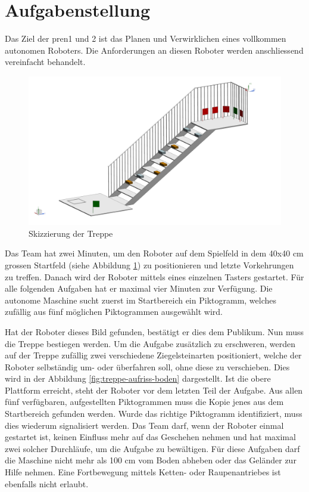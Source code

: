 \newpage
\section{Aufgabenstellung}

Das Ziel der \acrfull{pren1} und 2 ist das Planen und Verwirklichen eines vollkommen autonomen Roboters. Die Anforderungen an diesen Roboter werden anschliessend vereinfacht behandelt. 
 
\begin{figure}[H]
  \includegraphics[width=1\textwidth]{img/Aufgabenstellung.png}
  \centering
  \caption{Skizzierung der Treppe}
  \label{fig:seitenansicht-treppe}
\end{figure}
 
Das Team hat zwei Minuten, um den Roboter auf dem Spielfeld in dem 40x40 cm grossen 
Startfeld (siehe Abbildung \ref{fig:seitenansicht-treppe}) zu positionieren und letzte Vorkehrungen zu treffen. Danach wird der Roboter mittels eines einzelnen Tasters gestartet. 
Für alle folgenden Aufgaben hat er maximal vier Minuten zur Verfügung. 
Die autonome Maschine sucht zuerst im Startbereich ein Piktogramm, welches zufällig aus fünf möglichen Piktogrammen ausgewählt wird.

\newpage

Hat der Roboter dieses Bild gefunden, bestätigt er dies dem Publikum. Nun muss die Treppe bestiegen werden. Um die Aufgabe zusätzlich zu erschweren, werden auf der Treppe zufällig zwei verschiedene Ziegelsteinarten positioniert, welche der Roboter selbständig um- oder überfahren soll, ohne diese zu verschieben. Dies wird in der Abbildung \ref{fig:treppe-aufriss-boden} dargestellt. Ist die obere Plattform erreicht, steht der Roboter vor dem letzten Teil der Aufgabe. Aus allen fünf verfügbaren, aufgestellten Piktogrammen muss die Kopie jenes aus dem Startbereich gefunden werden. Wurde das richtige Piktogramm identifiziert, muss dies wiederum signalisiert werden. Das Team darf, wenn der Roboter einmal gestartet ist, keinen Einfluss mehr auf das Geschehen nehmen und hat maximal zwei solcher Durchläufe,
um die Aufgabe zu bewältigen. Für diese Aufgaben darf die Maschine nicht mehr als 100 cm vom Boden abheben oder das Geländer zur Hilfe nehmen. Eine Fortbewegung mittels Ketten- oder Raupenantriebes ist ebenfalls nicht erlaubt.

